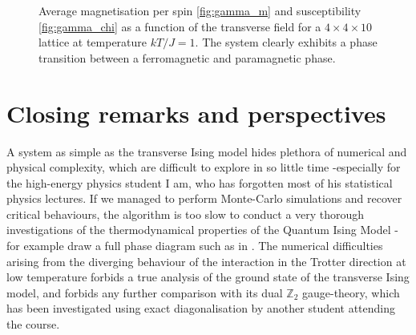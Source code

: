 \documentclass[11pt,openany]{article}
\begin{document}
\begin{figure}[H]
\begin{subfigure}{0.45\textwidth}
	\end{subfigure}
	\caption{Average magnetisation per spin \ref{fig:gamma_m} and susceptibility \ref{fig:gamma_chi} as a function of the transverse field for a $4\times4\times10$ lattice at temperature $kT/J=1$. The system clearly exhibits a phase transition between a ferromagnetic and paramagnetic phase.}
	\label{fig:gamma_transition}
\end{figure}

\section{Closing remarks and perspectives}

A system as simple as the transverse Ising model hides plethora of numerical and physical complexity, which are difficult to explore in so little time -especially for the high-energy physics student I am, who has forgotten most of his statistical physics lectures. If we managed to perform Monte-Carlo simulations and recover critical behaviours, the algorithm is too slow to conduct a very thorough investigations of the thermodynamical properties of the Quantum Ising Model -for example draw a full phase diagram such as in \cite{Chakrabarti}. The numerical difficulties arising from the diverging behaviour of the interaction in the Trotter direction at low temperature forbids a true analysis of the ground state of the transverse Ising model, and forbids any further comparison with its dual $\mathds{Z}_2$ gauge-theory, which has been investigated using exact diagonalisation by another student attending the course.


\clearpage\printbibliography
\end{document}

